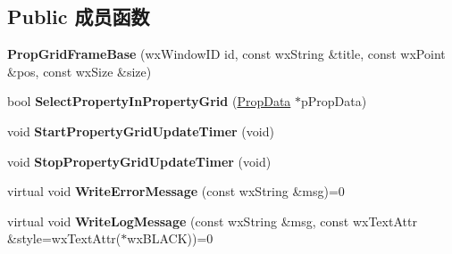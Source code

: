 \subsection*{Public 成员函数}
\begin{DoxyCompactItemize}
\item 
\hypertarget{class_prop_grid_frame_base_a47771957d6017132515598a4a3e781c0}{{\bfseries Prop\+Grid\+Frame\+Base} (wx\+Window\+I\+D id, const wx\+String \&title, const wx\+Point \&pos, const wx\+Size \&size)}\label{class_prop_grid_frame_base_a47771957d6017132515598a4a3e781c0}

\item 
\hypertarget{class_prop_grid_frame_base_aa094c258bb30b5e597dd9c3086bd92e2}{bool {\bfseries Select\+Property\+In\+Property\+Grid} (\hyperlink{class_prop_data}{Prop\+Data} $\ast$p\+Prop\+Data)}\label{class_prop_grid_frame_base_aa094c258bb30b5e597dd9c3086bd92e2}

\item 
\hypertarget{class_prop_grid_frame_base_a0da41a079fd1ecd8f54bec245e6b2720}{void {\bfseries Start\+Property\+Grid\+Update\+Timer} (void)}\label{class_prop_grid_frame_base_a0da41a079fd1ecd8f54bec245e6b2720}

\item 
\hypertarget{class_prop_grid_frame_base_a6043d2b9aafb4fff7209d35d3e875686}{void {\bfseries Stop\+Property\+Grid\+Update\+Timer} (void)}\label{class_prop_grid_frame_base_a6043d2b9aafb4fff7209d35d3e875686}

\item 
\hypertarget{class_prop_grid_frame_base_ad8e80f9fb570d3d7d6c32d6c731f8028}{virtual void {\bfseries Write\+Error\+Message} (const wx\+String \&msg)=0}\label{class_prop_grid_frame_base_ad8e80f9fb570d3d7d6c32d6c731f8028}

\item 
\hypertarget{class_prop_grid_frame_base_a7b9f09ce348d87031093c6a17a0c500f}{virtual void {\bfseries Write\+Log\+Message} (const wx\+String \&msg, const wx\+Text\+Attr \&style=wx\+Text\+Attr($\ast$wx\+B\+L\+A\+C\+K))=0}\label{class_prop_grid_frame_base_a7b9f09ce348d87031093c6a17a0c500f}

\end{DoxyCompactItemize}
